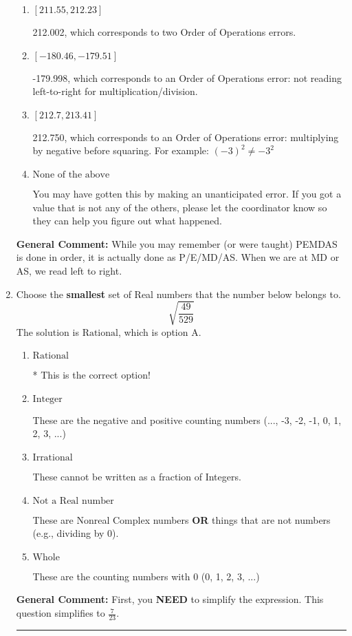 \documentclass{extbook}[14pt]
\newcommand{\litem}[1]{\item #1

\rule{\textwidth}{0.4pt}}
\begin{document}
\begin{enumerate}
{\begin{enumerate}[label=\Alph*.]
* -179.250, this is the correct option
\item \( [211.55, 212.23] \)

 212.002, which corresponds to two Order of Operations errors.
\item \( [-180.46, -179.51] \)

 -179.998, which corresponds to an Order of Operations error: not reading left-to-right for multiplication/division.
\item \( [212.7, 213.41] \)

 212.750, which corresponds to an Order of Operations error: multiplying by negative before squaring. For example: $(-3)^2 \neq -3^2$
\item \( \text{None of the above} \)

 You may have gotten this by making an unanticipated error. If you got a value that is not any of the others, please let the coordinator know so they can help you figure out what happened.
\end{enumerate}

\textbf{General Comment:} While you may remember (or were taught) PEMDAS is done in order, it is actually done as P/E/MD/AS. When we are at MD or AS, we read left to right.
}
\litem{
Choose the \textbf{smallest} set of Real numbers that the number below belongs to.
\[ \sqrt{\frac{49}{529}} \]The solution is \( \text{Rational} \), which is option A.\begin{enumerate}[label=\Alph*.]
\item \( \text{Rational} \)

* This is the correct option!
\item \( \text{Integer} \)

These are the negative and positive counting numbers (..., -3, -2, -1, 0, 1, 2, 3, ...)
\item \( \text{Irrational} \)

These cannot be written as a fraction of Integers.
\item \( \text{Not a Real number} \)

These are Nonreal Complex numbers \textbf{OR} things that are not numbers (e.g., dividing by 0).
\item \( \text{Whole} \)

These are the counting numbers with 0 (0, 1, 2, 3, ...)
\end{enumerate}

\textbf{General Comment:} First, you \textbf{NEED} to simplify the expression. This question simplifies to $\frac{7}{23}$. 
 
}
\end{enumerate}
\end{document}
